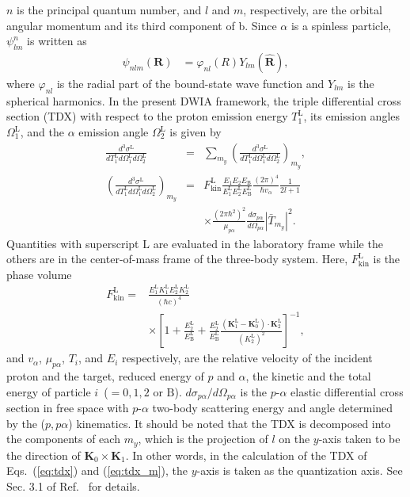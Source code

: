 \documentclass[%
 reprint,
superscriptaddress,
 amsmath,amssymb,
 aps,
]{revtex4-2}
\begin{document}
$n$ is the principal quantum number, and $l$ and $m$, respectively, are the 
orbital angular momentum and its third component of b. 
Since $\alpha$ is a spinless particle,
$\psi^n_{lm}$ is written as
\begin{align}
  \psi_{nlm}(\bm{R})
  &=
  \varphi_{nl}(R)Y_{lm}(\hat{\bm{R}}),
  \label{eq:phi-decomposition}
\end{align}
where $\varphi_{nl}$ is the radial part of the bound-state wave function and 
$Y_{lm}$ is the spherical harmonics. In the present DWIA framework, 
the triple differential cross section (TDX) with respect to the 
proton emission energy $T_1^\mathrm{L}$, its emission angles 
$\Omega_1^\mathrm{L}$, and the $\alpha$ emission angle $\Omega_2^\mathrm{L}$
is given by
\begin{eqnarray}
\frac{d^3\sigma^{\mathrm{L}}}{dT_1^\mathrm{L} d\Omega_1^\mathrm{L} d\Omega_2^\mathrm{L}}
&=&\sum_{m_y}
\left(
\frac{d^3\sigma^{\mathrm{L}}}{dT_1^\mathrm{L} d\Omega_1^\mathrm{L} d\Omega_2^\mathrm{L}}
\right)_{m_y}, 
\label{eq:tdx}\\
\left(
\frac{d^3\sigma^{\mathrm{L}}}{dT_1^\mathrm{L} d\Omega_1^\mathrm{L} d\Omega_2^\mathrm{L}}
\right)_{m_y}
&=&F_\mathrm{kin}^{\mathrm{L}} 
\frac{E_1 E_2 E_\mathrm{B}}{E_1^{\mathrm{L}} E_2^{\mathrm{L}} E_\mathrm{B}^{\mathrm{L}}}
\frac{(2\pi)^4}{\hbar v_\alpha} 
\frac{1}{2l+1} \nonumber \\
& &\times\frac{(2\pi \hbar^2)^2}{\mu_{p\alpha}}
\frac{d\sigma_{p\alpha}}{d\Omega_{p\alpha}} 
\left| \bar{T}_{m_y} \right|^2.
\label{eq:tdx_m}
\end{eqnarray}
% 
Quantities with superscript $\mathrm{L}$ are evaluated in the laboratory frame while 
the others are in the center-of-mass frame of the three-body system.
Here, $F_\mathrm{kin}^{\mathrm{L}}$ is the phase volume
\begin{align}
F_\mathrm{kin}^{\mathrm{L}} 
=&
\frac{E_1^{\mathrm{L}} K_1^{\mathrm{L}} E_2^{\mathrm{L}} K_2^{\mathrm{L}}}{(\hbar c)^4} \nonumber \\
& \times \left[
1 + \frac{E_2^{\mathrm{L}}}{E_{\mathrm{B}}^{\mathrm{L}}}
+\frac{E_2^{\mathrm{L}}}{E_{\mathrm{B}}^{\mathrm{L}}}
\frac{
\left(
\bm{K}_1^{\mathrm{L}} - \bm{K}_0^{\mathrm{L}}
\right)
\cdot \bm{K}_2^{\mathrm{L}}
}{
\left( K_2^{\mathrm{L}} \right)^2
}
\right]^{-1},
\end{align}
and $v_\alpha$, $\mu_{p\alpha}$, $T_i$, and $E_i$ respectively, are 
the relative velocity of the incident proton and the target,
reduced energy of $p$ and $\alpha$, 
the kinetic and the total energy of particle $i$~($=0,1,2$ or $\mathrm{B}$).
$d\sigma_{p\alpha}/d\Omega_{p\alpha}$ is the $p$-$\alpha$ elastic differential cross section in free space with $p$-$\alpha$ two-body scattering energy and angle determined by the ($p,p\alpha$) kinematics.
It should be noted that the TDX is decomposed into the components of each $m_y$, 
which is the projection of $l$ on the $y$-axis 
taken to be the direction of $\bm K_0 \times \bm K_1$.
In other words, in the calculation of the TDX of Eqs.~(\ref{eq:tdx}) and (\ref{eq:tdx_m}), 
the $y$-axis is taken as the quantization axis. 
See Sec. 3.1 of Ref.~\cite{Wakasa17} for details.
\end{document}
